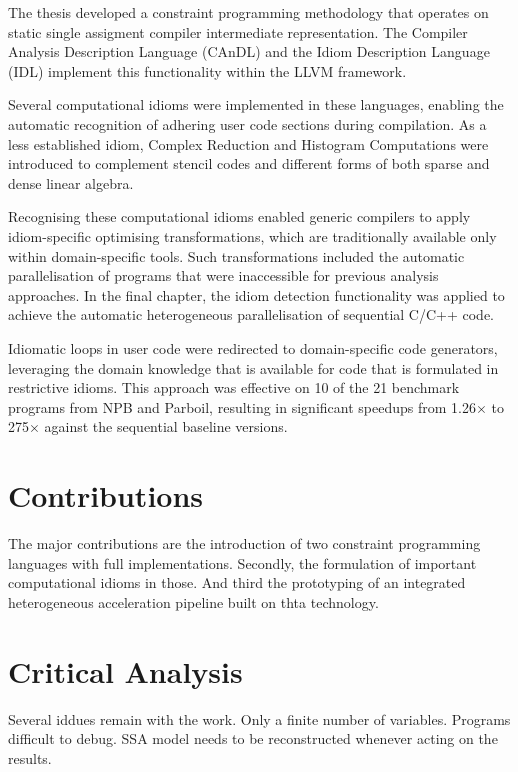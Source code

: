
    The thesis developed a constraint programming methodology that operates on
    static single assigment compiler intermediate representation.
    The Compiler Analysis Description Language (CAnDL) and the Idiom Description
    Language (IDL) implement this functionality within the LLVM framework.

    Several computational idioms were implemented in these languages,
    enabling the automatic recognition of adhering user code sections during
    compilation.
    As a less established idiom, Complex Reduction and Histogram Computations
    were introduced to complement stencil codes and different forms of both
    sparse and dense linear algebra.

    Recognising these computational idioms enabled generic compilers to apply
    idiom-specific optimising transformations, which are traditionally available
    only within domain-specific tools.
    Such transformations included the automatic parallelisation of programs that
    were inaccessible for previous analysis approaches.
    In the final chapter, the idiom detection functionality was applied to
    achieve the automatic heterogeneous parallelisation of sequential C/C++
    code.

    Idiomatic loops in user code were redirected to domain-specific code
    generators, leveraging the domain knowledge that is available for code that
    is formulated in restrictive idioms.
    This approach was effective on 10 of the 21 benchmark programs from NPB and
    Parboil, resulting in significant speedups from 1.26$\times$  to 275$\times$
    against the sequential baseline versions.

\section{Contributions}

    The major contributions are the introduction of two constraint programming
    languages with full implementations.
    Secondly, the formulation of important computational idioms in those.
    And third the prototyping of an integrated heterogeneous acceleration
    pipeline built on thta technology.

\section{Critical Analysis}

    Several iddues remain with the work.
    Only a finite number of variables.
    Programs difficult to debug.
    SSA model needs to be reconstructed whenever acting on the results.

